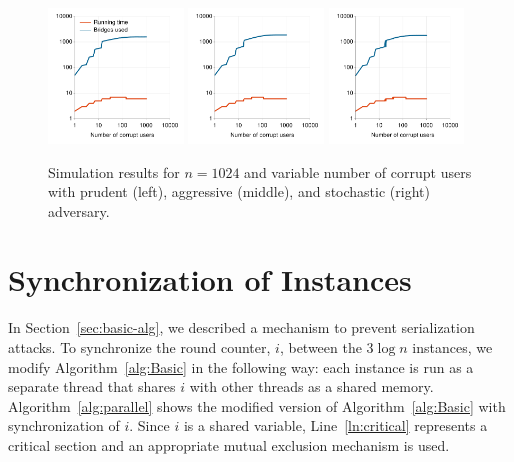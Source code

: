 \documentclass[a4paper,UKenglish]{lipics-v2016}
\begin{document}
\begin{figure}
	\hspace{-0.4em}
	\includegraphics[width=0.32\textwidth]{images/plot-prudent-VarT-1024}	
	\hspace{0.3em}
	\includegraphics[width=0.32\textwidth]{images/plot-aggressive-VarT-1024}	
	\hspace{0.3em}
	\includegraphics[width=0.32\textwidth]{images/plot-stochastic-VarT-1024}
	\caption{Simulation results for ${n=1024}$ and variable number of corrupt users with prudent (left), aggressive (middle), and stochastic (right) adversary.}
	\label{fig:plot2} 
\end{figure}

\section{Synchronization of Instances} \label{sec:synci}
In Section~\ref{sec:basic-alg}, we described a mechanism to prevent serialization attacks. To synchronize the round counter, $i$, between the $3\log{n}$ instances, we modify Algorithm~\ref{alg:Basic} in the following way: each instance is run as a separate thread that shares $i$ with other threads as a shared memory. Algorithm~\ref{alg:parallel} shows the modified version of Algorithm~\ref{alg:Basic} with synchronization of $i$. Since $i$ is a shared variable, Line~\ref{ln:critical} represents a critical section and an appropriate mutual exclusion mechanism is used.
\end{document}
